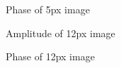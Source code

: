 \documentclass[12pt,a4paper,english
]{tunithesis}
\begin{document}
\begin{figure}[p]
    \centering
    \caption{Phase of 5px image}
    \label{fig:my_label}
\end{figure}

\begin{figure}[p]
    \centering
    \caption{Amplitude of 12px image}
    \label{fig:my_label}
\end{figure}

\begin{figure}[p]
    \centering
    \caption{Phase of 12px image}
    \label{fig:my_label}
\end{figure}
\end{document}
